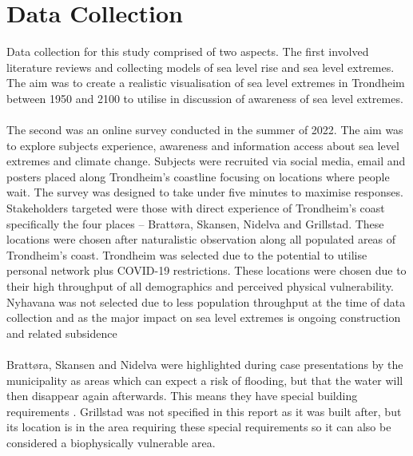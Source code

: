 \section{Data Collection}

Data collection for this study comprised of two aspects.  The first involved literature reviews and collecting models of sea level rise and sea level extremes. The aim was to create a realistic visualisation of sea level extremes in Trondheim between 1950 and 2100 to utilise in discussion of awareness of sea level extremes. 
    \paragraph{}
The second was an online survey conducted in the summer of 2022. The aim was to explore subjects experience, awareness and information access about sea level extremes and climate change. Subjects were recruited via social media, email and posters placed along Trondheim’s coastline focusing on locations where people wait. The survey was designed to take under five minutes to maximise responses. Stakeholders targeted were those with direct experience of Trondheim’s coast specifically the four places – Brattøra, Skansen, Nidelva and Grillstad. These locations were chosen after naturalistic observation along all populated areas of Trondheim’s coast. Trondheim was selected due to the potential to utilise personal network plus COVID-19 restrictions. These locations were chosen due to their high throughput of all demographics and perceived physical vulnerability. Nyhavana was not selected due to less population throughput at the time of data collection and as the major impact on sea level extremes is ongoing construction and related subsidence \cite{miljoenheten_og_byplankontoret_trondheim_kommune_9-notat-om-havnivastigning-og-stormflo---hensyn-i-arealplanlegging-nyhavnapdf_2020}


\paragraph{}
Brattøra, Skansen and Nidelva were highlighted during case presentations by the municipality as areas which can expect a risk of flooding, but that the water will then disappear again afterwards. This means they have special building requirements \cite{hanssen_saksframlegg_2013}. Grillstad was not specified in this report as it was built after, but its location is in the area requiring these special requirements so it can also be considered a biophysically vulnerable area.  

